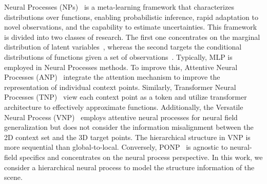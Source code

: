  Neural Processes (NPs)~\citep{garnelo2018neural} is a meta-learning framework that characterizes distributions over functions, enabling probabilistic inference, rapid adaptation to novel observations, and the capability to estimate uncertainties. This framework is divided into two classes of research. The first one concentrates on the marginal distribution of latent variables~\citep{garnelo2018neural}, whereas the second targets the conditional distributions of functions given a set of observations~\citep{garnelo2018conditional, gordon2019convolutional}. Typically, MLP is employed in Neural Processes methods. To improve this, Attentive Neural Processes (ANP)~\citep{kim2019attentive} integrate the attention mechanism to improve the representation of individual context points. Similarly, Transformer Neural Processes (TNP)~\citep{nguyen2022transformer} view each context point as a token and utilize transformer architecture to effectively approximate functions.
Additionally, the Versatile Neural Process (VNP)~\citep{guo2023versatile} employs attentive neural processes for neural field generalization but does not consider the information misalignment between the 2D context set and the 3D target points. The hierarchical structure in VNP is more sequential than global-to-local. Conversely, PONP~\citep{gu2023generalizable} is agnostic to neural-field specifics and concentrates on the neural process perspective. In this work, we consider a hierarchical neural process to model the structure information of the scene. 


